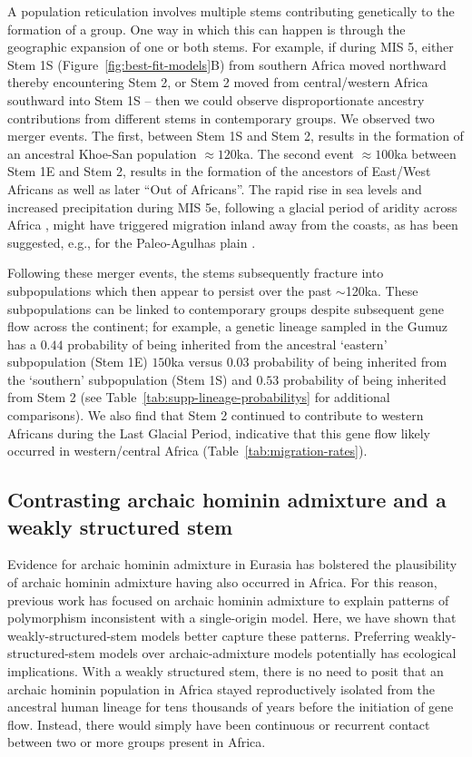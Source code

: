 \documentclass[]{article}
\begin{document}
A population reticulation involves multiple stems contributing genetically to
the formation of a group. One way in which this can happen is through the
geographic expansion of one or both stems. For example, if during MIS 5, either
Stem 1S (Figure~\ref{fig:best-fit-models}B) 
from southern Africa moved northward thereby encountering Stem 2,
or Stem 2 moved from central/western Africa southward into Stem 1S -- then we
could observe disproportionate ancestry contributions from different stems in
contemporary groups. We observed two merger events. The first, between Stem 1S and
Stem 2, results in the formation of an ancestral Khoe-San population $\approx120$ka.
The second event $\approx100$ka between Stem 1E and Stem 2,
results in the formation of the
ancestors of East/West Africans as well as later ``Out of Africans''. The rapid
rise in sea levels and increased precipitation during MIS 5e, following a
glacial period of aridity across Africa \citep{Blome2012-lw}, might have
triggered migration inland away from the coasts, as has been suggested, e.g., for the
Paleo-Agulhas plain \citep{Marean2014-pg}.


Following these merger events, the stems subsequently fracture into
subpopulations which then appear to persist over the past $\sim$120ka. These
subpopulations can be linked to contemporary groups despite subsequent gene flow
across the continent; for example, a genetic lineage sampled in the Gumuz has a
$0.44$ probability of being inherited from the ancestral ‘eastern’ subpopulation
(Stem 1E) $150$ka versus $0.03$ probability of being inherited from the ‘southern’
subpopulation (Stem 1S) and $0.53$ probability of being inherited from Stem 2
(see Table~\ref{tab:supp-lineage-probabilitys} for additional comparisons). We also
find that Stem 2 continued to contribute to western Africans during the Last
Glacial Period, indicative that this gene flow likely occurred in
western/central Africa (Table~\ref{tab:migration-rates}). 



\subsection*{Contrasting archaic hominin admixture and a weakly structured stem}

Evidence for archaic hominin admixture in Eurasia has bolstered the plausibility of 
archaic hominin admixture having also occurred in Africa. For this reason, previous 
work has focused on archaic hominin admixture to explain patterns of polymorphism 
inconsistent with a single-origin model. Here, we have shown that weakly-structured-stem 
models better capture these patterns. Preferring weakly-structured-stem models over 
archaic-admixture models potentially has ecological implications. With a weakly 
structured stem, there is no need to posit that an archaic hominin population in Africa stayed 
reproductively isolated from the ancestral human lineage for tens thousands of years before 
the initiation of gene flow. Instead, there would simply have been continuous or recurrent 
contact between two or more groups present in Africa. 
\end{document}
